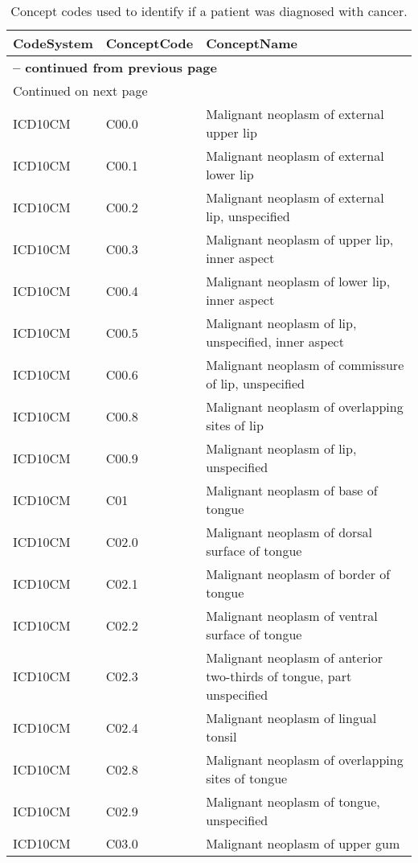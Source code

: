 \begin{longtable}{p{}p{}p{}}
\caption{Concept codes used to identify if a patient was diagnosed with cancer.} \\ 
 CodeSystem & ConceptCode & ConceptName \\ 
  \hline 
\endfirsthead 
\multicolumn{3}{p{\textwidth}}{{ \bfseries \tablename \thetable{} -- continued from previous page}} \ 
\hline CodeSystem & ConceptCode & ConceptName \\ \hline 
\endhead 
\hline \multicolumn{3}{p{\textwidth}}{{Continued on next page}} \\ \hline 
\endfoot 
\hline 
\endlastfoot 
 \hline
ICD10CM & C00.0 & Malignant neoplasm of external upper lip \\ 
  ICD10CM & C00.1 & Malignant neoplasm of external lower lip \\ 
  ICD10CM & C00.2 & Malignant neoplasm of external lip, unspecified \\ 
  ICD10CM & C00.3 & Malignant neoplasm of upper lip, inner aspect \\ 
  ICD10CM & C00.4 & Malignant neoplasm of lower lip, inner aspect \\ 
  ICD10CM & C00.5 & Malignant neoplasm of lip, unspecified, inner aspect \\ 
  ICD10CM & C00.6 & Malignant neoplasm of commissure of lip, unspecified \\ 
  ICD10CM & C00.8 & Malignant neoplasm of overlapping sites of lip \\ 
  ICD10CM & C00.9 & Malignant neoplasm of lip, unspecified \\ 
  ICD10CM & C01 & Malignant neoplasm of base of tongue \\ 
  ICD10CM & C02.0 & Malignant neoplasm of dorsal surface of tongue \\ 
  ICD10CM & C02.1 & Malignant neoplasm of border of tongue \\ 
  ICD10CM & C02.2 & Malignant neoplasm of ventral surface of tongue \\ 
  ICD10CM & C02.3 & Malignant neoplasm of anterior two-thirds of tongue, part unspecified \\ 
  ICD10CM & C02.4 & Malignant neoplasm of lingual tonsil \\ 
  ICD10CM & C02.8 & Malignant neoplasm of overlapping sites of tongue \\ 
  ICD10CM & C02.9 & Malignant neoplasm of tongue, unspecified \\ 
  ICD10CM & C03.0 & Malignant neoplasm of upper gum \\ 

\end{longtable}
